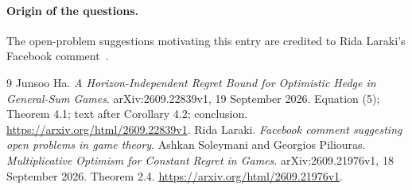 \documentclass[11pt]{article}
\begin{document}
\paragraph{Origin of the questions.}
The open-problem suggestions motivating this entry are credited to
Rida Laraki's Facebook comment~\cite{laraki-facebook}.
\begin{thebibliography}{9}
Junsoo Ha.
\emph{A Horizon-Independent Regret Bound for Optimistic Hedge in General-Sum Games}.
arXiv:2609.22839v1, 19 September 2026.
Equation (5); Theorem 4.1; text after Corollary 4.2; conclusion.
\url{https://arxiv.org/html/2609.22839v1}.
Rida Laraki.
\emph{Facebook comment suggesting open problems in game theory}.
Ashkan Soleymani and Georgios Piliouras.
\emph{Multiplicative Optimism for Constant Regret in Games}.
arXiv:2609.21976v1, 18 September 2026.
Theorem 2.4.
\url{https://arxiv.org/html/2609.21976v1}.
\end{thebibliography}
\end{document}
